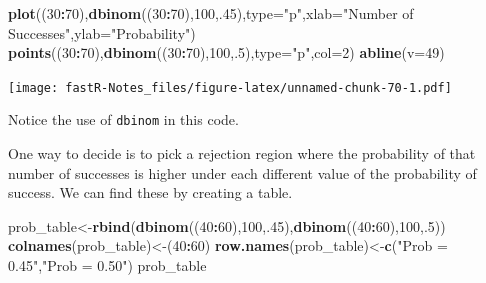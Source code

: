 \documentclass[]{book}
\newenvironment{Shaded}{\begin{snugshade}}{\end{snugshade}}
\newcommand{\KeywordTok}[1]{\textcolor[rgb]{0.13,0.29,0.53}{\textbf{#1}}}
\newcommand{\DataTypeTok}[1]{\textcolor[rgb]{0.13,0.29,0.53}{#1}}
\newcommand{\DecValTok}[1]{\textcolor[rgb]{0.00,0.00,0.81}{#1}}
\newcommand{\StringTok}[1]{\textcolor[rgb]{0.31,0.60,0.02}{#1}}
\newcommand{\OperatorTok}[1]{\textcolor[rgb]{0.81,0.36,0.00}{\textbf{#1}}}
\newcommand{\NormalTok}[1]{#1}
\theoremstyle{definition}
\theoremstyle{definition}
\theoremstyle{definition}
\theoremstyle{remark}
\begin{document}
\begin{Shaded}
\begin{Highlighting}[]
\KeywordTok{plot}\NormalTok{((}\DecValTok{30}\OperatorTok{:}\DecValTok{70}\NormalTok{),}\KeywordTok{dbinom}\NormalTok{((}\DecValTok{30}\OperatorTok{:}\DecValTok{70}\NormalTok{),}\DecValTok{100}\NormalTok{,.}\DecValTok{45}\NormalTok{),}\DataTypeTok{type=}\StringTok{"p"}\NormalTok{,}\DataTypeTok{xlab=}\StringTok{"Number of Successes"}\NormalTok{,}\DataTypeTok{ylab=}\StringTok{"Probability"}\NormalTok{)}
\KeywordTok{points}\NormalTok{((}\DecValTok{30}\OperatorTok{:}\DecValTok{70}\NormalTok{),}\KeywordTok{dbinom}\NormalTok{((}\DecValTok{30}\OperatorTok{:}\DecValTok{70}\NormalTok{),}\DecValTok{100}\NormalTok{,.}\DecValTok{5}\NormalTok{),}\DataTypeTok{type=}\StringTok{"p"}\NormalTok{,}\DataTypeTok{col=}\DecValTok{2}\NormalTok{)}
\KeywordTok{abline}\NormalTok{(}\DataTypeTok{v=}\DecValTok{49}\NormalTok{)}
\end{Highlighting}
\end{Shaded}

\texttt{[image: fastR-Notes\_files/figure-latex/unnamed-chunk-70-1.pdf]}

Notice the use of \texttt{dbinom} in this code.

One way to decide is to pick a rejection region where the probability of
that number of successes is higher under each different value of the
probability of success. We can find these by creating a table.

\begin{Shaded}
\begin{Highlighting}[]
\NormalTok{prob_table<-}\KeywordTok{rbind}\NormalTok{(}\KeywordTok{dbinom}\NormalTok{((}\DecValTok{40}\OperatorTok{:}\DecValTok{60}\NormalTok{),}\DecValTok{100}\NormalTok{,.}\DecValTok{45}\NormalTok{),}\KeywordTok{dbinom}\NormalTok{((}\DecValTok{40}\OperatorTok{:}\DecValTok{60}\NormalTok{),}\DecValTok{100}\NormalTok{,.}\DecValTok{5}\NormalTok{))}
\KeywordTok{colnames}\NormalTok{(prob_table)<-(}\DecValTok{40}\OperatorTok{:}\DecValTok{60}\NormalTok{)}
\KeywordTok{row.names}\NormalTok{(prob_table)<-}\KeywordTok{c}\NormalTok{(}\StringTok{"Prob = 0.45"}\NormalTok{,}\StringTok{"Prob = 0.50"}\NormalTok{)}
\NormalTok{prob_table}
\end{Highlighting}
\end{Shaded}
\end{document}
